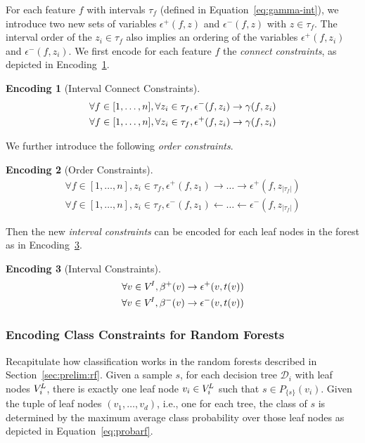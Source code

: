 \documentclass[a4paper, USenglish, cleveref, autoref, thm-restate]{lipics-v2021}
\theoremstyle{definition}
\newtheorem{encoding}{Encoding}[section]
\begin{document}
\newcommand{\interhv}[2]{\epsilon^+(#1,#2)}%
\newcommand{\interlv}[2]{\epsilon^-(#1,#2)}%
For each feature $f$ with intervals $\tau_f$ (defined in Equation~\ref{eq:gamma-int}), we introduce two new sets of variables $\interhv{f}{z}$ and $\interlv{f}{z}$ with $z \in \tau_f$. 
The interval order of the $z_i \in \tau_f$ also implies an ordering of the variables $\interhv{f}{z_i}$ and $\interlv{f}{z_i}$. 
We first encode for each feature $f$ the \emph{connect constraints}, as depicted in Encoding~\ref{enc:connect}. 
%
\begin{encoding}[Interval Connect Constraints]
\label{enc:connect}
\begin{align*}
\forall f \in [1, \dots, n], \forall z_i \in \tau_f, \interlv{f}{z_i} &\rightarrow \interv{f}{z_i}\\
\forall f \in [1, \dots, n], \forall z_i \in \tau_f, \interhv{f}{z_i} &\rightarrow \interv{f}{z_i}
\end{align*}
\end{encoding}
%
We further introduce the following \emph{order constraints}. 
%
\begin{encoding}[Order Constraints]
\begin{align*}
\forall f \in [1, \dots, n], z_i \in \tau_f, \interhv{f}{z_1} \rightarrow \dots \rightarrow \interhv{f}{z_{|\tau_f|}}\\
\forall f \in [1, \dots, n], z_i \in \tau_f, \interlv{f}{z_1} \leftarrow \dots \leftarrow \interlv{f}{z_{|\tau_f|}}
\end{align*}
\end{encoding}%
%
Then the new \emph{interval constraints} can be encoded for each leaf nodes in the forest as in Encoding~\ref{enc:inter-rf}. %
%
\begin{encoding}[Interval Constraints]
\label{enc:inter-rf}
\begin{align*}
\forall v \in \innernodes, \nodehv{v} \rightarrow \interhv{v}{t(v)}\\
\forall v \in \innernodes, \nodelv{v} \rightarrow \interlv{v}{t(v)}
\end{align*}
\end{encoding}


\subsubsection{Encoding Class Constraints for Random Forests}
\label{sec:class-rf}

Recapitulate how classification works in the random forests described in Section~\ref{sec:prelim:rf}. 
Given a sample $s$, for each decision tree $\mathcal{D}_i$ with leaf nodes $V^{\!L}_i$, there is exactly one leaf node $v_i \in V^{\!L}_i$ such that $s \in P_{\!\{\!s\!\}}(v_i)$. 
Given the tuple of leaf nodes $(v_1, \dots, v_d)$, i.e., one for each tree, the class of $s$ is determined by the maximum average class probability over those leaf nodes as depicted in Equation~\ref{eq:probarf}. 
\end{document}
